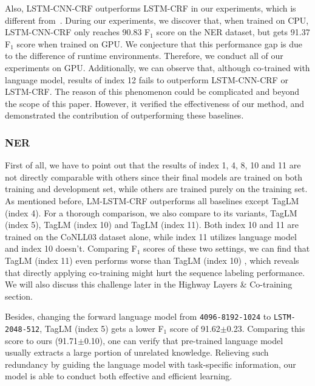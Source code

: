 \documentclass[letterpaper]{article} %
\newcommand{\our}{\textsc{LM-LSTM-CRF}\xspace}
\begin{document}
Also, LSTM-CNN-CRF outperforms LSTM-CRF in our experiments, which is different from~\cite{reimers2017reporting}.
During our experiments, we discover that, when trained on CPU, LSTM-CNN-CRF only reaches 90.83 F$_1$ score on the NER dataset, but gets 91.37 F$_1$ score when trained on GPU.
We conjecture that this performance gap is due to the difference of runtime environments.
Therefore, we conduct all of our experiments on GPU. 
Additionally, we can observe that, although co-trained with language model, results of index 12 fails to outperform LSTM-CNN-CRF or LSTM-CRF.
The reason of this phenomenon could be complicated and beyond the scope of this paper.
However, it verified the effectiveness of our method, and demonstrated the contribution of outperforming these baselines.

    \subsubsection{NER}
    First of all, we have to point out that the results of index 1, 4, 8, 10 and 11 are not directly comparable with others since their final models are trained on both training and development set, while others are trained purely on the training set. 
    As mentioned before, \our outperforms all baselines except TagLM (index 4).
    For a thorough comparison, we also compare to its variants, TagLM (index 5), TagLM (index 10) and TagLM (index 11).
    Both index 10 and 11 are trained on the CoNLL03 dataset alone, while index 11 utilizes language model and index 10 doesn't.
    Comparing F$_1$ scores of these two settings, we can find that TagLM (index 11) even performs worse than TagLM (index 10) , which reveals that directly applying co-training might hurt the sequence labeling performance.
    We will also discuss this challenge later in the Highway Layers \& Co-training section.

    Besides, changing the forward language model from \texttt{4096-8192-1024} to \texttt{LSTM-2048-512}, TagLM (index 5) gets a lower F$_1$ score of 91.62$\pm$0.23.
    Comparing this score to ours (91.71$\pm$0.10), one can verify that pre-trained language model usually extracts a large portion of unrelated knowledge.
    Relieving such redundancy by guiding the language model with task-specific information, our model is able to conduct both effective and efficient learning.
\end{document}
